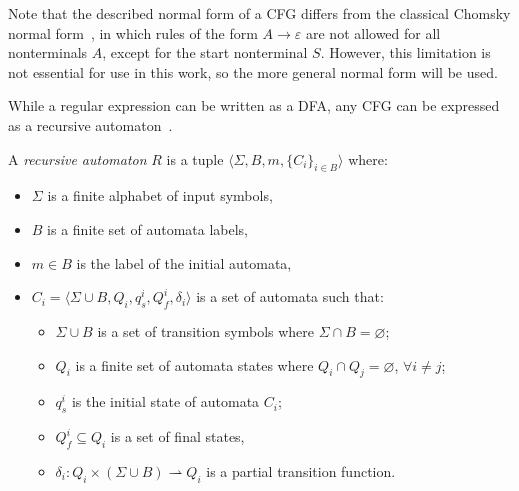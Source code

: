 Note that the described normal form of a CFG differs from the classical Chomsky normal form~\cite{chomsky1959certain}, in which rules of the form $A \rightarrow \varepsilon$ are not allowed for all nonterminals $A$, except for the start nonterminal $S$. However, this limitation is not essential for use in this work, so the more general normal form will be used.

While a regular expression can be written as a DFA, any CFG can be expressed as a recursive automaton~\cite{alur2005analysis}.

\begin{definition}
A \textit{recursive automaton} $R$ is a tuple $\langle \Sigma, B, m, \{C_i\}_{i \in B} \rangle$ where:
\begin{itemize}
    \item $\Sigma$ is a finite alphabet of input symbols,
    \item $B$ is a finite set of automata labels,
    \item $m \in B$ is the label of the initial automata,
    \item $C_i =  \langle \Sigma \cup B, Q_i, q_s^i, Q^i_f, \delta_i \rangle$ is a set of automata such that:
\begin{itemize}
    \item $\Sigma \cup B$ is a set of transition symbols where $\Sigma \cap B = \varnothing$;
    \item $Q_i$ is a finite set of automata states where $Q_i \cap Q_j = \varnothing$, $\forall i \neq j$;
    \item $q_s^i$ is the initial state of automata $C_i$;
    \item $Q_f^i \subseteq Q_i$ is a set of final states,
    \item $\delta_i: Q_i \times (\Sigma \cup B) \rightharpoonup Q_i$ is a partial transition function.
\end{itemize}
\end{itemize}
\end{definition}

